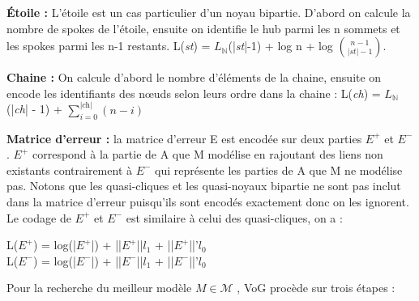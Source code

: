\textbf{Étoile :} L'étoile est un cas particulier d'un noyau bipartie. D'abord on calcule la nombre de spokes de l'étoile, ensuite on identifie le hub parmi les n sommets et les spokes parmi les n-1 restants.
L(\textit{st}) = $L_{\mathbb{N}}$(|\textit{st}|-1) +  log n + log ${n-1}\choose{|st|-1}$.

\textbf{Chaine :} On calcule d'abord le nombre d'éléments de la chaine, ensuite on encode les identifiants des nœuds selon leurs ordre dans la chaine :
L(\textit{ch}) = $L_{\mathbb{N}}$(|\textit{ch}| - 1) + $\sum\limits_{i=0}^{|\textit{ch}|} ( n - i )$

\textbf{Matrice d'erreur :} la matrice d'erreur E est encodée sur deux parties $E^{+}$ et $E^{-}$. $E^{+}$  correspond à la partie de A que M modélise en rajoutant des liens non existants contrairement à $E^{-}$ qui représente les parties de A que M ne modélise pas. Notons que les quasi-cliques et les quasi-noyaux bipartie ne sont pas inclut dans la matrice d'erreur puisqu'ils sont encodés exactement donc on les ignorent. Le codage de $E^{+}$ et $E^{-}$ est similaire à celui des quasi-cliques, on a :
\begin{center}
L(${E}^{+}$) = log(|${E}^{+}$|) + ||${E}^{+}$||\textit{$l_{1}$} + ||${E}^{+}$||'\textit{$l_{0}$}\\
L(${E}^{-}$) = log(|${E}^{-}$|) + ||${E}^{-}$||\textit{$l_{1}$} + ||${E}^{-}$||'\textit{$l_{0}$}\\
\end{center} 
Pour la recherche du meilleur modèle $ \textit{M} \in \mathcal{M} $ , VoG procède sur trois étapes :
